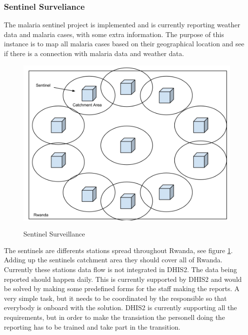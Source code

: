 \subsubsection{Sentinel Surveliance}
The malaria sentinel project is implemented and is currently reporting weather data and malaria cases, with some extra information.
The purpose of this instance is to map all malaria cases based on their geographical location and see if there is a connection with malaria data and weather data.  
\begin{figure}
\centering
\includegraphics[width=12cm]{empirical/images/sentinel_surveliance}
\label{fig:sentinel_surveliance}
\caption{Sentinel Surveillance}
\end{figure}
The sentinels are differents stations spread throughout Rwanda, see figure \ref{fig:sentinel_surveliance}. Adding up the sentinels catchment area they should cover all of Rwanda. 
Currently these stations data flow is not integrated in DHIS2. The data being reported should happen daily. This is currently supported by DHIS2 and would be solved by making some predefined forms for the staff making the reports.
A very simple task, but it needs to be coordinated by the responsible so that everybody is onboard with the solution.
DHIS2 is currently supporting all the requirements, but in order to make the transistion the personell doing the reporting has to be trained and take part in the transition.
